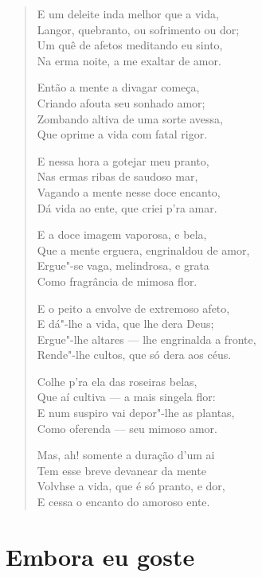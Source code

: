 \begin{verse}
E um deleite inda melhor que a vida,\\
Langor, quebranto, ou sofrimento ou dor;\\
Um quê de afetos meditando eu sinto,\\
Na erma noite, a me exaltar de amor.

Então a mente a divagar começa,\\
Criando afouta seu sonhado amor;\\
Zombando altiva de uma sorte avessa,\\
Que oprime a vida com fatal rigor.

E nessa hora a gotejar meu pranto,\\
Nas ermas ribas de saudoso mar,\\
Vagando a mente nesse doce encanto,\\
Dá vida ao ente, que criei p'ra amar.

E a doce imagem vaporosa, e bela,\\
Que a mente erguera, engrinaldou de amor,\\
Ergue"-se vaga, melindrosa, e grata\\
Como fragrância de mimosa flor.

E o peito a envolve de extremoso afeto,\\
E dá"-lhe a vida, que lhe dera Deus;\\
Ergue"-lhe altares --- lhe engrinalda a fronte,\\
Rende"-lhe cultos, que só dera aos céus.

Colhe p'ra ela das roseiras belas,\\
Que aí cultiva --- a mais singela flor:\\
E num suspiro vai depor"-lhe as plantas,\\
Como oferenda --- seu mimoso amor.

Mas, ah! somente a duração d'um ai\\
Tem esse breve devanear da mente\\
Volvhse a vida, que é só pranto, e dor,\\
E cessa o encanto do amoroso ente.
\end{verse}

\chapter{Embora eu goste}

